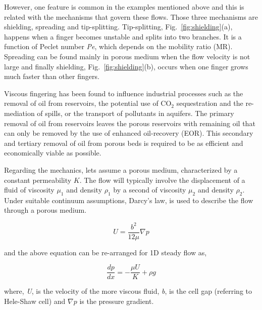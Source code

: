 \documentclass[preprint,authoryear,12pt]{elsarticle}
\begin{document}
However, one feature is common in the examples mentioned above and this is related with the mechanisms that govern these flows. Those three mechanisms are shielding, spreading and tip-splitting. Tip-splitting, Fig.~\ref{fig:shielding}(a), happens when a finger becomes unstable and splits into two branches. It is a function of Peclet number \textit{Pe}, which depends on the mobility ratio (MR). Spreading can be found mainly in porous medium when the flow velocity is not large and finally shielding, Fig.~\ref{fig:shielding}(b), occurs when one finger grows much faster than other fingers.

Viscous fingering has been found to influence industrial processes such as the removal of oil from reservoirs, the potential use of CO$_2$ sequestration and the re-mediation of spills, or the transport of pollutants in aquifers. The primary removal of oil from reservoirs leaves the porous reservoirs with remaining oil that can only be removed by the use of enhanced oil-recovery (EOR). This secondary and tertiary removal of oil from porous beds is required to be as efficient and economically viable as possible.


Regarding the mechanics, lets assume a porous medium, characterized by a constant permeability $K$. The flow will typically involve the displacement of a fluid of viscosity $\mu_1$  and density $\rho_1$ by a second of viscosity $\mu_2$ and density $\rho_2$. Under suitable continuum assumptions, Darcy's law, is used to describe the flow through a porous medium.

\begin{equation}
 U = \frac{b^2}{12 \mu} \nabla p
\end{equation}

and the above equation can be re-arranged for 1D steady flow as,

\begin{equation}
 \frac{dp}{dx}= - \frac{\mu U}{K} + \rho g 
\end{equation}


where, \textit{U}, is the velocity of the more viscous fluid, \textit{b}, is the cell gap (referring to Hele-Shaw cell) and \textit{$\nabla p$} is the pressure gradient.
\end{document}
